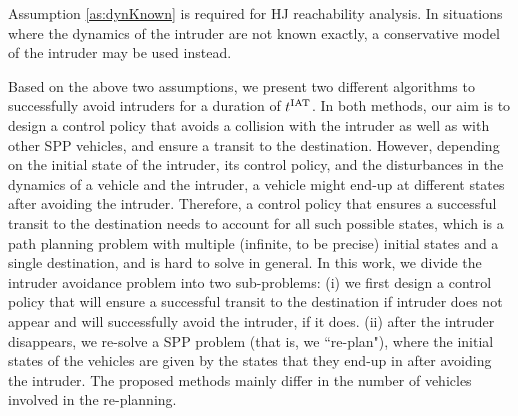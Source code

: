 Assumption \ref{as:dynKnown} is required for HJ reachability analysis. In situations where the dynamics of the intruder are not known exactly, a conservative model of the intruder may be used instead.

Based on the above two assumptions, we present two different algorithms to successfully avoid intruders for a duration of $t^\text{IAT}$. In both methods, our aim is to design a control policy that avoids a collision with the intruder as well as with other SPP vehicles, and ensure a transit to the destination. However, depending on the initial state of the intruder, its control policy, and the disturbances in the dynamics of a vehicle and the intruder, a vehicle might end-up at different states after avoiding the intruder. Therefore, a control policy that ensures a successful transit to the destination needs to account for all such possible states, which is a path planning problem with multiple (infinite, to be precise) initial states and a single destination, and is hard to solve in general. In this work, we divide the intruder avoidance problem into two sub-problems: (i) we first design a control policy that will ensure a successful transit to the destination if intruder does not appear and will successfully avoid the intruder, if it does. (ii) after the intruder disappears, we re-solve a SPP problem (that is, we ``re-plan"), where the initial states of the vehicles are given by the states that they end-up in after avoiding the intruder. 
The proposed methods mainly differ in the number of vehicles involved in the re-planning. 


